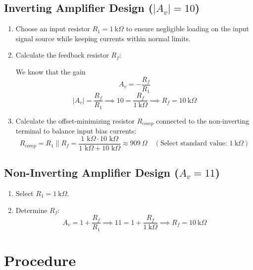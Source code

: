 \subsection{Inverting Amplifier Design ($|A_v| = 10$)}
\begin{enumerate}
	\item Choose an input resistor $R_1 = \SI{1}{\kilo\Omega}$ to ensure negligible loading on the input signal source while keeping currents within normal limits.
	\item Calculate the feedback resistor $R_f$:
	
	We know that the gain 
	\[ 
	A_v=-\frac{R_f}{R_1}
	\]
	\begin{equation}
		|A_v| = \frac{R_f}{R_1} \implies 10 = \frac{R_f}{\SI{1}{\kilo\Omega}} \implies R_f = \SI{10}{\kilo\Omega}
	\end{equation}
	\item Calculate the offset-minimizing resistor $R_{comp}$ connected to the non-inverting terminal to balance input bias currents:
	\begin{equation}
		R_{comp} = R_1 \parallel R_f = \frac{1\text{ k}\Omega \cdot 10\text{ k}\Omega}{1\text{ k}\Omega + 10\text{ k}\Omega} \approx \SI{909}{\Omega} \quad (\text{Select standard value: } \SI{1}{\kilo\Omega})
	\end{equation}
\end{enumerate}

\subsection{Non-Inverting Amplifier Design ($A_v = 11$)}
\begin{enumerate}
	\item Select $R_1 = \SI{1}{\kilo\Omega}$.
	\item Determine $R_f$:
	\begin{equation}
		A_v = 1 + \frac{R_f}{R_1} \implies 11 = 1 + \frac{R_f}{\SI{1}{\kilo\Omega}} \implies R_f = \SI{10}{\kilo\Omega}
	\end{equation}
\end{enumerate}

\section{Procedure}

